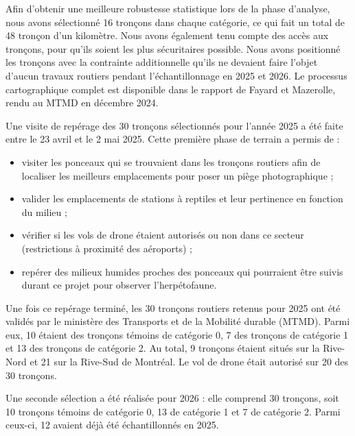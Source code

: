 Afin d'obtenir une meilleure robustesse statistique lors de la phase d'analyse, nous
avons sélectionné 16 tronçons dans chaque catégorie, ce qui fait un total de 48
tronçon d'un kilomètre. Nous avons également tenu compte des accès aux tronçons, pour
qu'ils soient les plus sécuritaires possible. Nous avons positionné les tronçons avec la contrainte additionnelle qu'ils ne devaient faire l'objet d'aucun travaux routiers pendant l'échantillonnage en 2025 et 2026. Le processus cartographique complet est disponible dans le rapport de Fayard et Mazerolle, rendu au MTMD en décembre 2024.

Une visite de repérage des 30 tronçons sélectionnés pour l'année 2025 a été faite entre le 23 avril et le 2 mai 2025. Cette première phase de terrain a permis de :

\begin{itemize}
  \item visiter les ponceaux qui se trouvaient dans les tronçons routiers afin de
        localiser les meilleurs emplacements pour poser un piège photographique ;
  \item valider les emplacements de stations à reptiles et leur pertinence en
        fonction du milieu ;
  \item vérifier si les vols de drone étaient autorisés ou non dans ce secteur
        (restrictions à proximité des aéroports) ;
  \item repérer des milieux humides proches des ponceaux qui pourraient être suivis
        durant ce projet pour observer l'herpétofaune.
\end{itemize}

Une fois ce repérage terminé, les 30 tronçons routiers retenus pour 2025 ont été validés par le ministère des Transports et de la Mobilité durable (MTMD). Parmi eux, 10 étaient des tronçons témoins de catégorie 0, 7 des tronçons de catégorie 1 et 13 des tronçons de catégorie 2. Au total, 9 tronçons étaient situés sur la Rive-Nord et 21 sur la Rive-Sud de Montréal. Le vol de drone était autorisé sur 20 des 30 tronçons.

Une seconde sélection a été réalisée pour 2026 : elle comprend 30 tronçons, soit 10 tronçons témoins de catégorie 0, 13 de catégorie 1 et 7 de catégorie 2. Parmi ceux-ci, 12 avaient déjà été échantillonnés en 2025.
